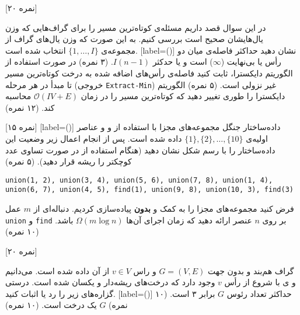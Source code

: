 \newpage
{}[۲۰ نمره]

در این سوال قصد داریم مسئله‌ی کوتاه‌ترین مسیر را برای گراف‌هایی که وزن یال‌هایشان صحیح است بررسی کنیم. به این صورت که وزن یال‌های گراف از مجموعه‌ی
$ \{1, \dots, I\} $
انتخاب شده است.
[label=(\alph*)]
 نشان دهید حداکثر فاصله‌ی میان دو رأس یا بی‌نهایت ($ \infty $) است و یا حدکثر $ I(n-1) $. (۳ نمره)
 در صورت استفاده از الگوریتم دایکسترا، ثابت کنید فاصله‌ی رأس‌های اضافه شده به درخت کوتاه‌ترین مسیر تا مبدأ در هر مرحله (خروجی \texttt{Extract-Min}) غیر نزولی است. (۵ نمره)
 الگوریتم دایکسترا را طوری تغییر دهید که کوتاه‌ترین مسیر را در زمان 
$ \mathcal{O}(IV+E) $
محاسبه کند. (۱۲ نمره)

[۱۵ نمره]
[label=(\alph*)]
 داده‌ساختار جنگل مجموعه‌های مجزا با استفاده از  و  و عناصر اولیه‌ی 
$ \{1\}, \{2\}, \dots, \{10\} $
داده شده است. پس از انجام اعمال زیر وضعیت این داده‌ساختار را با رسم شکل نشان دهید (هنگام استفاده از  در صورت تساوی عدد کوچکتر را ریشه قرار دهید). (۵ نمره)
\begin{LTR}
\texttt{union(1, 2), union(3, 4), union(5, 6), union(7, 8), union(1, 4),\\
union(6, 7), union(4, 5), find(1), union(9, 8), union(10, 3), find(3)
}
\end{LTR}
 فرض کنید مجموعه‌های مجزا را به کمک   و \textbf{بدون}   پیاده‌سازی کردیم. دنباله‌ای از $ m $ عمل 
\texttt{union} و \texttt{find}
بر روی $ ‌n $ عنصر ارائه دهید که زمان اجرای آن‌ها
$ \Omega(m\log{n}) $
باشد. (۱۰ نمره)

[۲۰ نمره]

گراف هم‌بند و بدون جهت $  G = (V, E) $ و راس $ v \in V $ از آن داده شده است. می‌دانیم  و ی با شروع از رأس $ v $ وجود دارد که درخت‌های ریشه‌دار  و  یکسان شده است. درستی گزاره‌های زیر را رد یا اثبات کنید.
[label=(\alph*)]
 حداکثر تعداد رئوس $ G $ برابر ۳ است. (۱۰ نمره)
 $ G $ یک درخت است. (۱۰ نمره)

